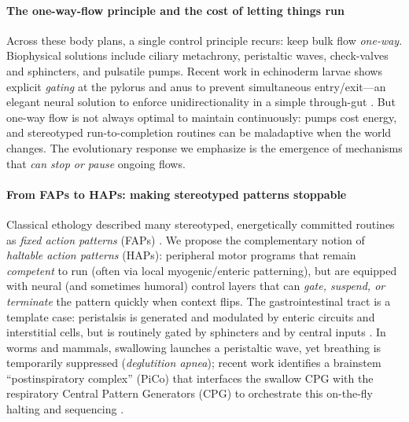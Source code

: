 \paragraph{The one-way-flow principle and the cost of letting things run}
Across these body plans, a single control principle recurs: keep bulk flow \emph{one-way}. Biophysical solutions include ciliary metachrony, peristaltic waves, check-valves and sphincters, and pulsatile pumps. Recent work in echinoderm larvae shows explicit \emph{gating} at the pylorus and anus to prevent simultaneous entry/exit—an elegant neural solution to enforce unidirectionality in a simple through-gut \citep{Yaguchi2024Sphincter}. But one-way flow is not always optimal to maintain continuously: pumps cost energy, and stereotyped run-to-completion routines can be maladaptive when the world changes. The evolutionary response we emphasize is the emergence of mechanisms that \emph{can stop or pause} ongoing flows. 

\paragraph{From FAPs to HAPs: making stereotyped patterns stoppable}
Classical ethology described many stereotyped, energetically committed routines as \emph{fixed action patterns} (FAPs) \citep{Ronacher2019FAP}. We propose the complementary notion of \emph{haltable action patterns} (HAPs): peripheral motor programs that remain \emph{competent} to run (often via local myogenic/enteric patterning), but are equipped with neural (and sometimes humoral) control layers that can \emph{gate, suspend, or terminate} the pattern quickly when context flips. The gastrointestinal tract is a template case: peristalsis is generated and modulated by enteric circuits and interstitial cells, but is routinely gated by sphincters and by central inputs \citep{Sharkey2022ENS}. In worms and mammals, swallowing launches a peristaltic wave, yet breathing is temporarily suppressed (\emph{deglutition apnea}); recent work identifies a brainstem “postinspiratory complex” (PiCo) that interfaces the swallow CPG with the respiratory Central Pattern Generators (CPG)  to orchestrate this on-the-fly halting and sequencing \citep{Matsuo2009Coordination,Barlow2009CPGOralResp,Moore2014BrainstemOrofacial,Huff2023PiCo}. 

